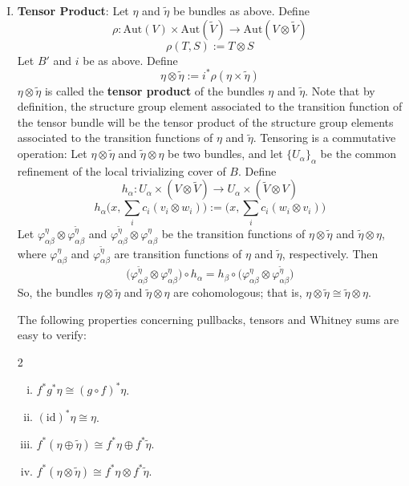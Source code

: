 \documentclass[11pt,a4paper]{article}
\begin{document}
\begin{enumerate}[(I)]
    \item \textbf{Tensor Product}: Let $\eta$ and $\widetilde{\eta}$ be bundles as above. Define
$$\rho: \text{Aut}(V)\times\text{Aut}(\widetilde{V}) \rightarrow \text{Aut}(V\otimes\widetilde{V})$$
$$\rho(T, S):= T\otimes S$$
Let $B'$ and $i$ be as above. Define
$$\eta\otimes\widetilde{\eta}:= i^*\rho(\eta\times\widetilde{\eta})$$
$\eta\otimes\widetilde{\eta}$ is called the \textbf{tensor product} of the bundles $\eta$ and $\widetilde{\eta}$. Note that by definition, the structure group element associated to the transition function of the tensor bundle will be the tensor product of the structure group elements associated to the transition functions of $\eta$ and $\widetilde{\eta}$. Tensoring is a commutative operation: Let $\eta\otimes\widetilde{\eta}$ and $\widetilde{\eta}\otimes\eta$ be two bundles, and let $\{U_{\alpha}\}_{\alpha}$ be the common refinement of the local trivializing cover of $B$. Define
$$h_{\alpha}:U_{\alpha}\times (V\otimes\widetilde V)\rightarrow U_{\alpha}\times (\widetilde V\otimes V)$$
$$h_{\alpha}\bigg(x, \sum_{i}{c_i(v_i\otimes w_i)}\bigg):= \bigg(x, \sum_{i}{c_i(w_i\otimes v_i)}\bigg)$$
Let $\varphi_{\alpha\beta}^{\eta}\otimes\varphi_{\alpha\beta}^{\widetilde{\eta}}$ and $ \varphi_{\alpha\beta}^{\widetilde{\eta}}\otimes\varphi_{\alpha\beta}^{\eta}$ be the transition functions of $\eta\otimes\widetilde{\eta}$ and $\widetilde{\eta}\otimes\eta$, where $\varphi_{\alpha\beta}^{\eta}$ and $\varphi_{\alpha\beta}^{\widetilde{\eta}}$ are transition functions of $\eta$ and $\widetilde{\eta}$, respectively. Then
$$\big(\varphi_{\alpha\beta}^{\widetilde{\eta}}\otimes\varphi_{\alpha\beta}^{\eta}\big)\circ h_{\alpha} = h_{\beta}\circ\big(\varphi_{\alpha\beta}^{\eta}\otimes\varphi_{\alpha\beta}^{\widetilde{\eta}}\big)$$
So, the bundles $\eta\otimes\widetilde{\eta}$ and $\widetilde{\eta}\otimes\eta$ are cohomologous; that is, $\eta\otimes\widetilde{\eta} \cong \widetilde{\eta}\otimes\eta$.

The following properties concerning pullbacks, tensors and Whitney sums are easy to verify:

\begin{multicols}{2}
\begin{enumerate}[(i)]
    \item $f^*g^*\eta \cong (g\circ f)^*\eta$.
    \item $(\text{id})^*\eta \cong \eta$.
    \item $f^*(\eta\oplus\widetilde{\eta}) \cong f^*\eta \oplus f^*\widetilde{\eta}$.
    \item $f^*(\eta\otimes\widetilde{\eta})\cong f^*\eta\otimes f^*\widetilde{\eta}$.
\end{enumerate}
\end{multicols}



\end{enumerate}
\end{document}
